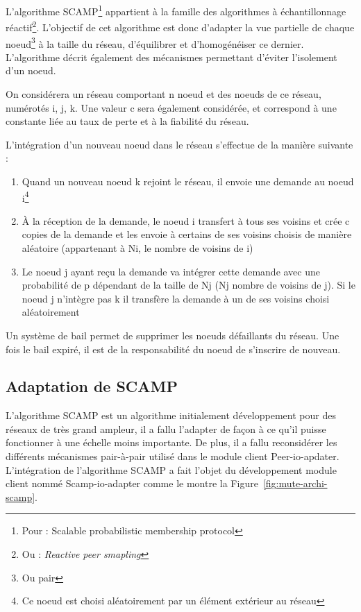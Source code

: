 \documentclass{tnreport}
\begin{document}
L'algorithme SCAMP\footnote{Pour : Scalable probabilistic membership protocol} appartient à la famille des algorithmes à échantillonnage réactif\footnote{Ou : \emph{Reactive peer smapling}}. L'objectif de cet algorithme est donc d'adapter la vue partielle de chaque noeud\footnote{Ou pair} à la taille du réseau, d'équilibrer et d'homogénéiser ce dernier. L'algorithme décrit également des mécanismes permettant d'éviter l'isolement d'un noeud.

On considérera un réseau comportant n noeud et des noeuds de ce réseau, numérotés i, j, k. Une valeur c sera également considérée, et correspond à une constante liée au taux de perte et à la fiabilité du réseau.

L'intégration d'un nouveau noeud dans le réseau s'effectue de la manière suivante :
\begin{enumerate}
  \item Quand un nouveau noeud k rejoint le réseau, il envoie une demande au noeud i\footnote{Ce noeud est choisi aléatoirement par un élément extérieur au réseau}
  \item À la réception de la demande, le noeud i transfert à tous ses voisins et crée c copies de la demande et les envoie à certains de ses voisins choisis de manière aléatoire (appartenant à Ni, le nombre de voisins de i)
  \item Le noeud j ayant reçu la demande va intégrer cette demande avec une probabilité de p dépendant de la taille de Nj (Nj nombre de voisins de j). Si le noeud j n'intègre pas k il transfère la demande à un de ses voisins choisi aléatoirement\\
\end{enumerate}

 Un système de bail permet de supprimer les noeuds défaillants du réseau. Une fois le bail expiré, il est de la responsabilité du noeud de s'inscrire de nouveau.

\subsection{Adaptation de SCAMP}

L'algorithme SCAMP est un algorithme initialement développement pour des réseaux de très grand ampleur, il a fallu l'adapter de façon à ce qu'il puisse fonctionner à une échelle moins importante. De plus, il a fallu reconsidérer les différents mécanismes pair-à-pair utilisé dans le module client Peer-io-apdater. L'intégration de l'algorithme SCAMP a fait l'objet du développement module client nommé Scamp-io-adapter comme le montre la Figure~\ref{fig:mute-archi-scamp}.
\end{document}
